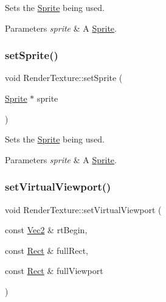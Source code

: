 Sets the \hyperlink{classSprite}{Sprite} being used.


\begin{DoxyParams}{Parameters}
{\em sprite} & A \hyperlink{classSprite}{Sprite}. \\
\hline
\end{DoxyParams}
\mbox{\label{classRenderTexture_a68570f2b0fe7e04eb842a3ab11ffd7f7}} 
\subsubsection{\texorpdfstring{set\+Sprite()}{setSprite()}\hspace{0.1cm}{\footnotesize\ttfamily [2/2]}}
{\footnotesize\ttfamily void Render\+Texture\+::set\+Sprite (\begin{DoxyParamCaption}\item[{\hyperlink{classSprite}{Sprite} $\ast$}]{sprite }\end{DoxyParamCaption})}

Sets the \hyperlink{classSprite}{Sprite} being used.


\begin{DoxyParams}{Parameters}
{\em sprite} & A \hyperlink{classSprite}{Sprite}. \\
\hline
\end{DoxyParams}
\mbox{\label{classRenderTexture_a0b508deeb3efa8522314973a54e97815}} 
\subsubsection{\texorpdfstring{set\+Virtual\+Viewport()}{setVirtualViewport()}\hspace{0.1cm}{\footnotesize\ttfamily [1/2]}}
{\footnotesize\ttfamily void Render\+Texture\+::set\+Virtual\+Viewport (\begin{DoxyParamCaption}\item[{const \hyperlink{classVec2}{Vec2} \&}]{rt\+Begin,  }\item[{const \hyperlink{classRect}{Rect} \&}]{full\+Rect,  }\item[{const \hyperlink{classRect}{Rect} \&}]{full\+Viewport }\end{DoxyParamCaption})}

